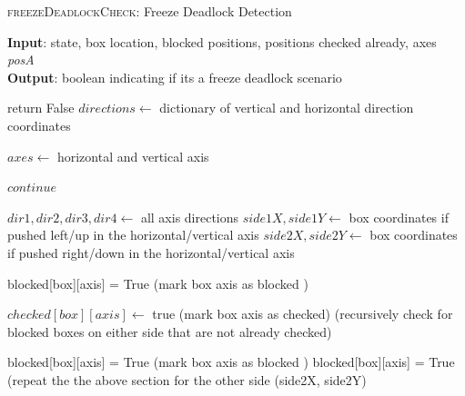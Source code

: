 \documentclass{article}
\begin{document}
\begin{algorithm}
    \caption{\textsc{freezeDeadlockCheck}: Freeze Deadlock Detection}\label{euclid}
    \hspace*{\algorithmicindent} \textbf{Input}: state, box location, blocked positions, positions checked already, axes \emph{posA} \\
    \hspace*{\algorithmicindent} \textbf{Output}: boolean indicating if its a freeze deadlock scenario \\
    \begin{algorithmic}
        \State return False
    \EndIf
    \State $directions \gets$ dictionary of vertical and horizontal direction coordinates
    
    
    
    
    \State $axes \gets$ horizontal and vertical axis
    
            \State $continue$
        \EndIf
        
        \State $dir1, dir2, dir3, dir4 \gets$ all axis directions
        \State $side1X, side1Y \gets$ box coordinates if pushed left/up in the horizontal/vertical axis
        \State $side2X, side2Y \gets$ box coordinates if pushed right/down in the horizontal/vertical axis
        
            \State blocked[box][axis] = True (mark box axis as blocked )
        \EndIf
        
        \State  $checked[box][axis] \gets$ true (mark box axis as checked) 
        \State (recursively check for blocked boxes on either side that are not already checked)
        
                blocked[box][axis] = True (mark box axis as blocked )
                    \State blocked[box][axis] = True
                \EndIf
            \EndIf
        \EndIf
        \State (repeat the  the above section for the other side (side2X, side2Y)
    \EndFor
        

\end{algorithmic}
\end{algorithm}
\end{document}

